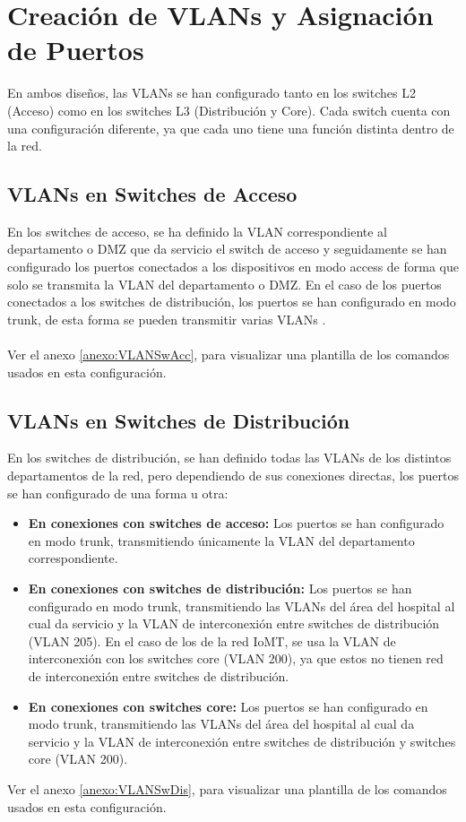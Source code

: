\section{Creación de VLANs y Asignación de Puertos}
En ambos diseños, las VLANs se han configurado tanto en los switches L2 (Acceso) como en los switches L3 (Distribución y Core). Cada switch cuenta con una configuración diferente, ya que cada uno tiene una función distinta dentro de la red.
\subsection{VLANs en Switches de Acceso}
En los switches de acceso, se ha definido la VLAN correspondiente al departamento o DMZ que da servicio el switch de acceso y seguidamente se han configurado los puertos conectados a los dispositivos en modo access de forma que solo se transmita la VLAN del departamento o DMZ. En el caso 
de los puertos conectados a los switches de distribución, los puertos se han configurado en modo trunk, de esta forma se pueden transmitir varias VLANs \cite{cisco_trunk_access}.  
\\ \\
Ver el anexo \ref{anexo:VLANSwAcc}, para visualizar una plantilla de los comandos usados en esta configuración.
\subsection{VLANs en Switches de Distribución}
En los switches de distribución, se han definido todas las VLANs de los distintos departamentos de la red, pero dependiendo de sus conexiones directas, los puertos se han configurado de una forma u otra:
\begin{itemize}
    \item \textbf{En conexiones con switches de acceso:} Los puertos se han configurado en modo trunk, transmitiendo únicamente la VLAN del departamento correspondiente.
    \item \textbf{En conexiones con switches de distribución:} Los puertos se han configurado en modo trunk, transmitiendo las VLANs del área del hospital al cual da servicio y la VLAN de interconexión entre switches de distribución (VLAN 205). En el caso de los de la red IoMT, se usa la VLAN de interconexión con los switches core (VLAN 200), ya que estos no tienen red de interconexión entre switches de distribución.
    \item \textbf{En conexiones con switches core:} Los puertos se han configurado en modo trunk, transmitiendo las VLANs del área del hospital al cual da servicio y la VLAN de interconexión entre switches de distribución y switches core (VLAN 200).
\end{itemize}
Ver el anexo \ref{anexo:VLANSwDis}, para visualizar una plantilla de los comandos usados en esta configuración.
